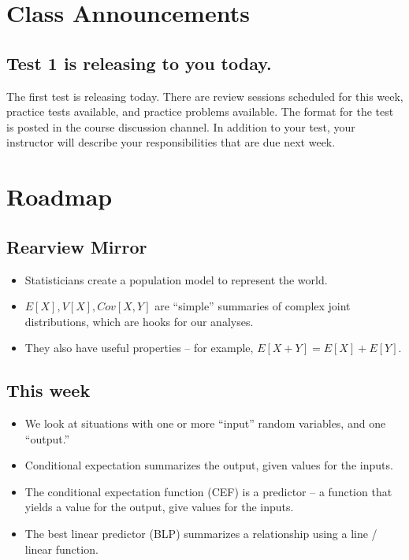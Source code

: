 \documentclass[
]{book}
\providecommand{\tightlist}{%
  \setlength{\itemsep}{0pt}\setlength{\parskip}{0pt}}
\theoremstyle{definition}
\theoremstyle{definition}
\theoremstyle{definition}
\theoremstyle{definition}
\theoremstyle{remark}
\begin{document}
\hypertarget{class-announcements-2}{%
\section{Class Announcements}\label{class-announcements-2}}

\hypertarget{test-1-is-releasing-to-you-today.}{%
\subsection{Test 1 is releasing to you today.}\label{test-1-is-releasing-to-you-today.}}

The first test is releasing today. There are review sessions scheduled for this week, practice tests available, and practice problems available. The format for the test is posted in the course discussion channel. In addition to your test, your instructor will describe your responsibilities that are due next week.

\hypertarget{roadmap}{%
\section{Roadmap}\label{roadmap}}

\hypertarget{rearview-mirror}{%
\subsection{Rearview Mirror}\label{rearview-mirror}}

\begin{itemize}
\tightlist
\item
  Statisticians create a population model to represent the world.
\item
  \(E[X], V[X], Cov[X,Y]\) are ``simple'' summaries of complex joint distributions, which are hooks for our analyses.
\item
  They also have useful properties -- for example, \(E[X + Y] = E[X] + E[Y]\).
\end{itemize}

\hypertarget{this-week}{%
\subsection{This week}\label{this-week}}

\begin{itemize}
\tightlist
\item
  We look at situations with one or more ``input'' random variables, and one ``output.''
\item
  Conditional expectation summarizes the output, given values for the inputs.
\item
  The conditional expectation function (CEF) is a predictor -- a function that yields a value for the output, give values for the inputs.
\item
  The best linear predictor (BLP) summarizes a relationship using a line / linear function.
\end{itemize}
\end{document}
